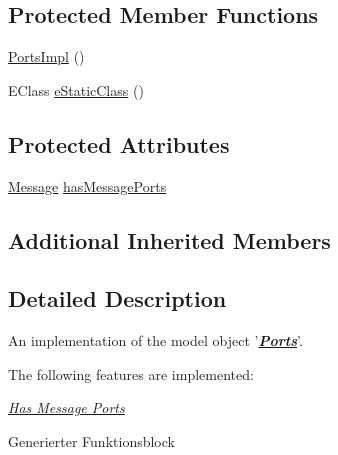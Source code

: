 \subsection*{Protected Member Functions}
\begin{DoxyCompactItemize}
\item 
\hyperlink{classshootingmachineemfmodel_1_1impl_1_1_ports_impl_a93553b53e80e12d834f5e34ef1e5123c}{Ports\-Impl} ()
\item 
E\-Class \hyperlink{classshootingmachineemfmodel_1_1impl_1_1_ports_impl_a76916896463ccf51aa6d3c429ec615c9}{e\-Static\-Class} ()
\end{DoxyCompactItemize}
\subsection*{Protected Attributes}
\begin{DoxyCompactItemize}
\item 
\hyperlink{interfaceshootingmachineemfmodel_1_1_message}{Message} \hyperlink{classshootingmachineemfmodel_1_1impl_1_1_ports_impl_a93cb80a8d555dfecfb01128d8bf8c08e}{has\-Message\-Ports}
\end{DoxyCompactItemize}
\subsection*{Additional Inherited Members}


\subsection{Detailed Description}
An implementation of the model object '{\itshape {\bfseries \hyperlink{interfaceshootingmachineemfmodel_1_1_ports}{Ports}}}'.

The following features are implemented\-: 
\begin{DoxyItemize}
\item \hyperlink{classshootingmachineemfmodel_1_1impl_1_1_ports_impl_a8a87593dadc10c56c8a0e5a67ecaafbe}{{\itshape Has Message Ports}} 
\end{DoxyItemize}

Generierter Funktionsblock 

